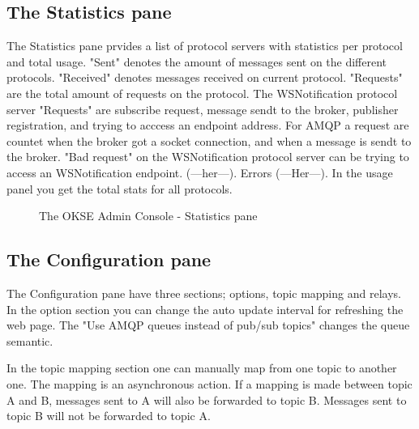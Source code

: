 \subsection{The Statistics pane}
The Statistics pane prvides a list of protocol servers with statistics per protocol and total usage. "Sent" denotes the amount of messages sent on the different protocols. "Received" denotes messages received on current protocol. "Requests" are the total amount of requests on the protocol. The WSNotification protocol server "Requests" are subscribe request, message sendt to the broker, publisher registration, and trying to acccess an endpoint address. For AMQP a request are countet when the broker got a socket connection, and when a message is sendt to the broker. "Bad request" on the WSNotification protocol server can be trying to access an WSNotification endpoint. (---her---). Errors (---Her---). In the usage panel you get the total stats for all protocols.

\begin{center}
  \begin{figure}[ht!]
    \caption{The OKSE Admin Console - Statistics pane} 
    \label{fig:OKSE Admin Console - Statistics pane}
  \end{figure}
\end{center}

\subsection{The Configuration pane}
The Configuration pane have three sections; options, topic mapping and relays. In the option section you can change the auto update interval for refreshing the web page. The "Use AMQP queues instead of pub/sub topics" changes the queue semantic.

In the topic mapping section one can manually map from one topic to another one. The mapping is an asynchronous action. If a mapping is made between topic A and B, messages sent to A will also be forwarded to topic B. Messages sent to topic B will not be forwarded to topic A.

